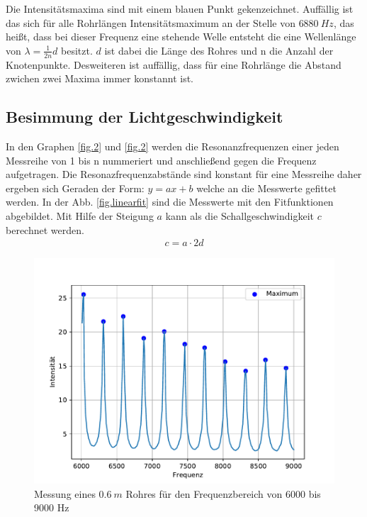 Die Intensitätsmaxima sind mit einem blauen Punkt gekenzeichnet.
Auffällig ist das sich für alle Rohrlängen Intensitätsmaximum an der Stelle von $\SI{6880}{Hz}$, das heißt, dass bei dieser Frequenz eine stehende Welle entsteht die eine Wellenlänge von $\lambda=\frac{1}{2n}d$ besitzt.
$d$ ist dabei die Länge des Rohres und n die Anzahl der Knotenpunkte.
Desweiteren ist auffällig, dass für eine Rohrlänge die Abstand zwichen zwei Maxima immer konstannt ist.

\subsection{Besimmung der Lichtgeschwindigkeit}
In den Graphen \ref{fig.2} und \ref{fig.2} werden die Resonanzfrequenzen einer jeden Messreihe von 1 bis n nummeriert und anschließend gegen die Frequenz aufgetragen.
Die Resonazfrequenzabstände sind konstant für eine Messreihe daher ergeben sich Geraden der Form: $y=ax+b$ welche an die Messwerte gefittet werden.
In der Abb. \ref{fig.linearfit} sind die Messwerte mit den Fitfunktionen abgebildet.
Mit Hilfe der Steigung $a$ kann als die Schallgeschwindigkeit $c$ berechnet werden.
\begin{align*}
  c = a\cdot2d
\end{align*}
\begin{figure}[h!]
  \centering
  \includegraphics[width=\textwidth]{A1L8x75mmF6000-9000S10.pdf}
  \caption{Messung eines $\SI{0.6}{m}$ Rohres für den Frequenzbereich von 6000 bis 9000 Hz}
  \label{fig.frequenz/rohrlänge}
\end{figure}
